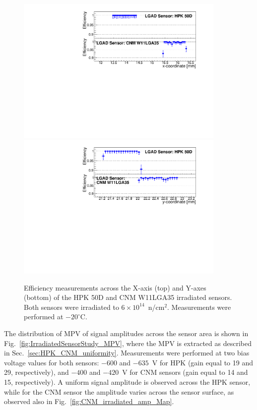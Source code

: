 \documentclass[preprint,1p]{elsarticle}
\begin{document}
\begin{figure}[htbp] 
\centering
\includegraphics[width=0.90\textwidth]{figs/USCSBoard_HPK50DIrradiated-CNMW11LGA35_Run936-961/IrradiatedSensorStudy_Efficiency_vs_X.pdf} 
\includegraphics[width=0.90\textwidth]{figs/USCSBoard_HPK50DIrradiated-CNMW11LGA35_Run936-961/IrradiatedSensorStudy_Efficiency_vs_Y.pdf} 
\caption{Efficiency measurements across the X-axis (top) and Y-axes (bottom) of the HPK 50D and CNM W11LGA35 irradiated sensors. Both sensors were irradiated to $6\times 10^{14}$~n/cm$^2$. Measurements were performed at $-20^{\circ}$C.} 
\label{fig:IrradiatedSensorStudy_Efficiency} 
\end{figure} 

The distribution of MPV of signal amplitudes across the sensor area is shown in
Fig.~\ref{fig:IrradiatedSensorStudy_MPV}, where the MPV is extracted as
described in Sec.~\ref{sec:HPK_CNM_uniformity}. Measurements were performed at
two bias voltage values for both sensors: $-600$ and $-635$~V for HPK (gain
equal to 19 and 29, respectively), and $-400$ and $-420$~V for CNM sensors (gain
equal to 14 and 15, respectively). A uniform signal amplitude is observed across
the HPK sensor, while for the CNM sensor the amplitude varies across the sensor
surface, as observed also in Fig.~\ref{fig:CNM_irradiated_amp_Map}. 
\end{document}
